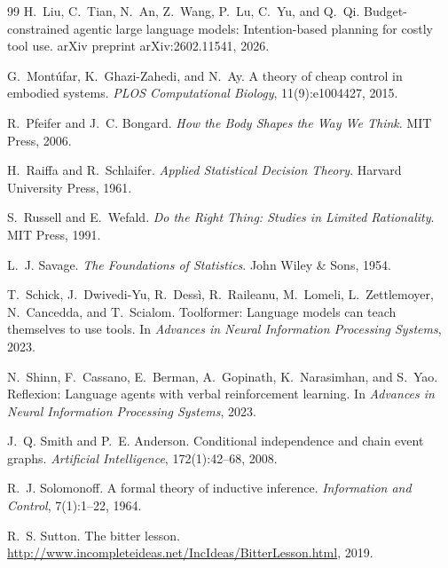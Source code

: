 \documentclass[11pt]{article}
\begin{document}
\begin{thebibliography}{99}
H.~Liu, C.~Tian, N.~An, Z.~Wang, P.~Lu, C.~Yu, and Q.~Qi.
\newblock Budget-constrained agentic large language models: Intention-based planning for costly tool use.
\newblock arXiv preprint arXiv:2602.11541, 2026.

G.~Mont\'{u}far, K.~Ghazi-Zahedi, and N.~Ay.
\newblock A theory of cheap control in embodied systems.
\newblock \emph{PLOS Computational Biology}, 11(9):e1004427, 2015.

R.~Pfeifer and J.~C. Bongard.
\newblock \emph{How the Body Shapes the Way We Think}.
\newblock MIT Press, 2006.

H.~Raiffa and R.~Schlaifer.
\newblock \emph{Applied Statistical Decision Theory}.
\newblock Harvard University Press, 1961.

S.~Russell and E.~Wefald.
\newblock \emph{Do the Right Thing: Studies in Limited Rationality}.
\newblock MIT Press, 1991.

L.~J. Savage.
\newblock \emph{The Foundations of Statistics}.
\newblock John Wiley \& Sons, 1954.

T.~Schick, J.~Dwivedi-Yu, R.~Dess\`{i}, R.~Raileanu, M.~Lomeli, L.~Zettlemoyer, N.~Cancedda, and T.~Scialom.
\newblock Toolformer: Language models can teach themselves to use tools.
\newblock In \emph{Advances in Neural Information Processing Systems}, 2023.

N.~Shinn, F.~Cassano, E.~Berman, A.~Gopinath, K.~Narasimhan, and S.~Yao.
\newblock Reflexion: Language agents with verbal reinforcement learning.
\newblock In \emph{Advances in Neural Information Processing Systems}, 2023.

J.~Q. Smith and P.~E. Anderson.
\newblock Conditional independence and chain event graphs.
\newblock \emph{Artificial Intelligence}, 172(1):42--68, 2008.

R.~J. Solomonoff.
\newblock A formal theory of inductive inference.
\newblock \emph{Information and Control}, 7(1):1--22, 1964.

R.~S. Sutton.
\newblock The bitter lesson.
\newblock \url{http://www.incompleteideas.net/IncIdeas/BitterLesson.html}, 2019.


\end{thebibliography}
\end{document}
